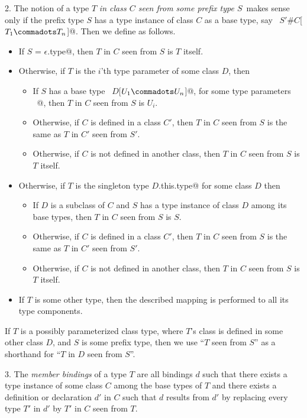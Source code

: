 2. The notion of a type $T$
{\em in class $C$ seen from some prefix type
$S\,$} makes sense only if the prefix type $S$
has a type instance of class $C$ as a base type, say
~\lstinline@$S'$#$C$[$T_1 \commadots T_n$]@. Then we define as follows.
\begin{itemize}
 \item 
  If \lstinline@$S$ = $\epsilon$.type@, then $T$ in $C$ seen from $S$ is $T$ itself.
 \item Otherwise, if $T$ is the $i$'th type parameter of some class $D$, then
   \begin{itemize}
   \item
   If $S$ has a base type ~\lstinline@$D$[$U_1 \commadots U_n$]@, for some type parameters
   ~\lstinline@[$U_1 \commadots U_n$]@, then $T$ in $C$ seen from $S$ is $U_i$.
   \item
   Otherwise, if $C$ is defined in a class $C'$, then
   $T$ in $C$ seen from $S$ is the same as $T$ in $C'$ seen from $S'$.
   \item
   Otherwise, if $C$ is not defined in another class, then  
   $T$ in $C$ seen from $S$ is $T$ itself.
  \end{itemize}
\item
   Otherwise, 
   if $T$ is the singleton type \lstinline@$D$.this.type@ for some class $D$
   then
   \begin{itemize}
   \item
   If $D$ is a subclass of $C$ and 
   $S$ has a type instance of class $D$ among its base types,
   then $T$ in $C$ seen from $S$ is $S$.
   \item
   Otherwise, if $C$ is defined in a class $C'$, then
   $T$ in $C$ seen from $S$ is the same as $T$ in $C'$ seen from $S'$.
   \item
   Otherwise, if $C$ is not defined in another class, then  
   $T$ in $C$ seen from $S$ is $T$ itself.
   \end{itemize}
\item
  If $T$ is some other type, then the described mapping is performed
  to all its type components.
\end{itemize}

If $T$ is a possibly parameterized class type, where $T$'s class
is defined in some other class $D$, and $S$ is some prefix type,
then we use ``$T$ seen from $S$'' as a shorthand for
``$T$ in $D$ seen from $S$''.

3. The {\em member bindings} of a type $T$ are all bindings $d$ such that
there exists a type instance of some class $C$ among the base types of $T$
and there exists a definition or declaration $d'$ in $C$
such that $d$ results from $d'$ by replacing every
type $T'$ in $d'$ by $T'$ in $C$ seen from $T$.

